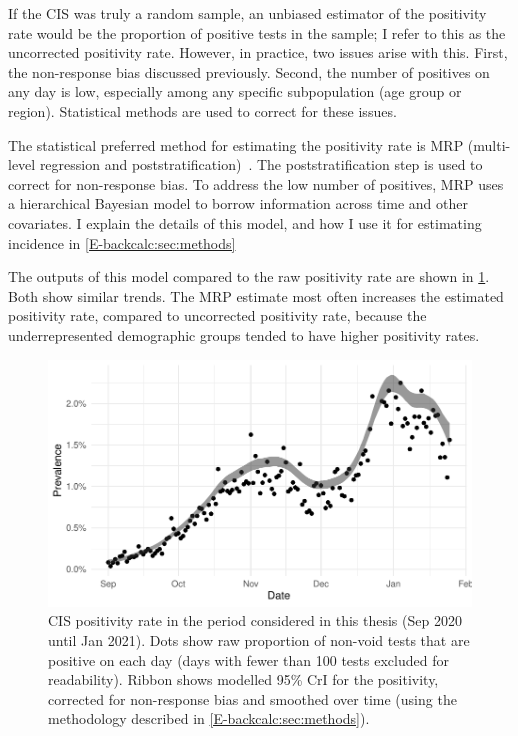 \documentclass[thesis.tex]{subfiles}
\begin{document}
If the CIS was truly a random sample, an unbiased estimator of the positivity rate would be the proportion of positive tests in the sample; I refer to this as the uncorrected positivity rate.
However, in practice, two issues arise with this.
First, the non-response bias discussed previously.
Second, the number of positives on any day is low, especially among any specific subpopulation (\eg age group or region).
Statistical methods are used to correct for these issues.

The statistical preferred method for estimating the positivity rate is MRP (multi-level regression and poststratification)~\autocite{cisMethodsONS,pouwelsCommunity}.
The poststratification step is used to correct for non-response bias.
To address the low number of positives, MRP uses a hierarchical Bayesian model to borrow information across time and other covariates.
I explain the details of this model, and how I use it for estimating incidence in \cref{E-backcalc:sec:methods}

The outputs of this model compared to the raw positivity rate are shown in \cref{biology-data:fig:CIS-positivity}.
Both show similar trends.
The MRP estimate most often increases the estimated positivity rate, compared to uncorrected positivity rate, because the underrepresented demographic groups tended to have higher positivity rates.

\begin{figure}
  \centering \includegraphics[width=\textwidth]{biology-data/CIS-positivity}
  \caption[CIS positivity]{%
    CIS positivity rate in the period considered in this thesis (Sep 2020 until Jan 2021).
    Dots show raw proportion of non-void tests that are positive on each day (days with fewer than 100 tests excluded for readability).
    Ribbon shows modelled 95\% CrI for the positivity, corrected for non-response bias and smoothed over time (using the methodology described in \cref{E-backcalc:sec:methods}).
  }
  \label{biology-data:fig:CIS-positivity}
\end{figure}
\end{document}
